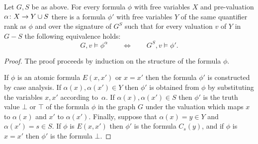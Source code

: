 \begin{lemma}\label{lem:remove-s}Let $G,S$ be as above.	
For every formula $\phi$ with free variables $X$ and pre-valuation $\alpha\colon X\to Y\cup S$
there is a formula $\phi'$ with free variables $Y$
of the same quantifier rank as $\phi$ and over the signature of $G^S$
 such that for every valuation $v$ of $Y$ in $G-S$
the following equivalence holds:
$$G,v\models\phi^{\alpha}\qquad\iff\qquad G^S,v\models\phi'.$$
\end{lemma}
\begin{proof}
The proof proceeds by induction on the structure of the formula $\phi$. 

If $\phi$ is an atomic formula $E(x,x')$ or $x=x'$ then the formula $\phi'$ is constructed by case analysis. If $\alpha(x),\alpha(x')\in Y$ then $\phi'$
is obtained from $\phi$ by substituting the variables $x,x'$ according to~$\alpha$. If  $\alpha(x),\alpha(x')\in S$ then $\phi'$ is the truth value $\bot$ or $\top$ of 
the formula $\phi$ in the graph $G$ under the valuation which maps $x$ to $\alpha(x)$ and $x'$ to $\alpha(x')$. Finally, suppose that $\alpha(x)=y\in Y$ and $\alpha(x')=s\in S$. If $\phi$ is $E(x,x')$ then $\phi'$ is the formula $C_{s}(y)$, and if $\phi$ is $x=x'$ then $\phi'$ is the formula $\bot$.
 
 

%
%






\end{proof}
